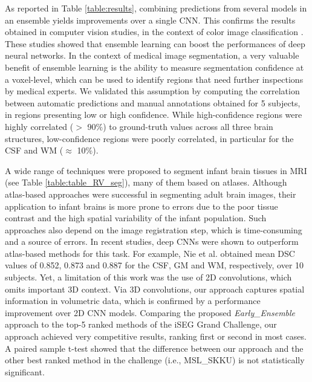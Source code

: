 \documentclass[twoside,espcrc2]{elsarticle}
\begin{document}
As reported in Table \ref{table:results}, combining predictions from several models in an ensemble yields improvements over a single CNN. This confirms the results obtained in computer vision studies, in the context of color image classification \cite{krizhevsky2012imagenet,zeiler2014visualizing}. These studies showed that ensemble learning can boost the performances of deep neural networks. 
In the context of medical image segmentation, a very valuable benefit of ensemble learning is the ability to measure segmentation confidence at a voxel-level, which can be used to identify regions that need further inspections by medical experts. We validated this assumption by computing the correlation between automatic predictions and manual annotations obtained for 5 subjects, in regions presenting low or high confidence. While high-confidence regions were highly correlated ($>$ 90$\%$) to ground-truth values across all three brain structures, low-confidence regions were poorly correlated, in particular for the CSF and WM ($\approx$ 10$\%$). 


A wide range of techniques were proposed to segment infant brain tissues in MRI (see Table \ref{table:table_RV_seg}), many of them based on atlases. Although atlas-based approaches were successful in segmenting adult brain images, their application to infant brains is more prone to errors due to the poor tissue contrast and the high spatial variability of the infant population. Such approaches also depend on the image registration step, which is time-consuming and a source of errors. In recent studies, deep CNNs were shown to outperform atlas-based methods for this task. For example, Nie et al. \cite{nie2016fully} obtained mean DSC values of 0.852, 0.873 and 0.887 for the CSF, GM and WM, respectively, over 10 subjects. Yet, a limitation of this work was the use of 2D convolutions, which omits important 3D context. Via 3D convolutions, our approach captures spatial information in volumetric data, which is confirmed by a performance improvement over 2D CNN models. Comparing the proposed \textit{Early\_Ensemble} approach to the top-5 ranked methods of the iSEG Grand Challenge, our approach achieved very competitive results, ranking first or second in most cases. A paired sample t-test showed that the difference between our approach and the other best ranked method in the challenge (i.e.,  MSL\_SKKU) is not statistically significant.
\end{document}
